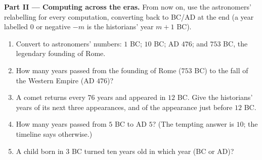 \begin{problem}
\medskip
\noindent\textbf{Part II --- Computing across the eras.}
From now on, use the astronomers' relabelling for every
computation, converting back to BC/AD at the end (a year labelled
$0$ or negative $-m$ is the historians' year $m + 1$ BC).
\begin{enumerate}[resume]
  \item Convert to astronomers' numbers: $1$ BC; $10$ BC; AD
        $476$; and $753$ BC, the legendary founding of Rome.
  \item How many years passed from the founding of Rome
        ($753$ BC) to the fall of the Western Empire (AD $476$)?
  \item A comet returns every $76$ years and appeared in
        $12$ BC. Give the historians' years of its next three
        appearances, and of the appearance just before $12$ BC.
  \item How many years passed from $5$ BC to AD $5$? (The
        tempting answer is $10$; the timeline says otherwise.)
  \item A child born in $3$ BC turned ten years old in which
        year (BC or AD)?
\end{enumerate}


\end{problem}
